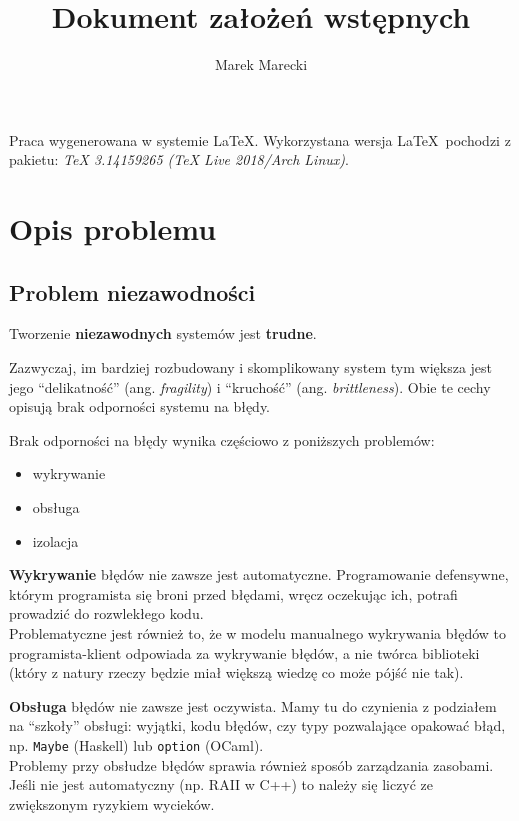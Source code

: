 \documentclass[11pt,oneside,a4paper,titlepage,onecolumn]{article}
\author{Marek Marecki}
\title{Dokument założeń wstępnych}
\begin{document}
\maketitle

Praca wygenerowana w systemie \LaTeX.
Wykorzystana wersja \LaTeX~pochodzi z pakietu: \emph{TeX 3.14159265 (TeX Live 2018/Arch Linux)}.

\tableofcontents

\newpage

\section{Opis problemu}
\label{opis_problemu}

\subsection{Problem niezawodności}

\begin{center}
    Tworzenie \textbf{niezawodnych} systemów jest \textbf{trudne}.
\end{center}

Zazwyczaj, im bardziej rozbudowany i skomplikowany system tym większa jest
jego ``delikatność'' (ang. \emph{fragility}) i ``kruchość'' (ang. \emph{brittleness}).
Obie te cechy opisują brak odporności systemu na błędy.

Brak odporności na błędy wynika częściowo z poniższych problemów:

\begin{itemize}
\item wykrywanie
\item obsługa
\item izolacja
\end{itemize}

\textbf{Wykrywanie} błędów nie zawsze jest automatyczne. Programowanie defensywne, którym
programista się broni przed błędami, wręcz oczekując ich, potrafi prowadzić do rozwlekłego kodu. \\
Problematyczne jest również to, że w modelu manualnego wykrywania błędów to programista-klient
odpowiada za wykrywanie błędów, a nie twórca biblioteki (który z natury rzeczy będzie miał większą
wiedzę co może pójść nie tak).

\textbf{Obsługa} błędów nie zawsze jest oczywista. Mamy tu do czynienia z podziałem na ``szkoły''
obsługi: wyjątki, kodu błędów, czy typy pozwalające opakować błąd, np. \texttt{Maybe} (Haskell) lub
\texttt{option} (OCaml). \\
Problemy przy obsłudze błędów sprawia również sposób zarządzania zasobami. Jeśli nie jest
automatyczny (np. RAII w C++) to należy się liczyć ze zwiększonym ryzykiem wycieków.
\end{document}
